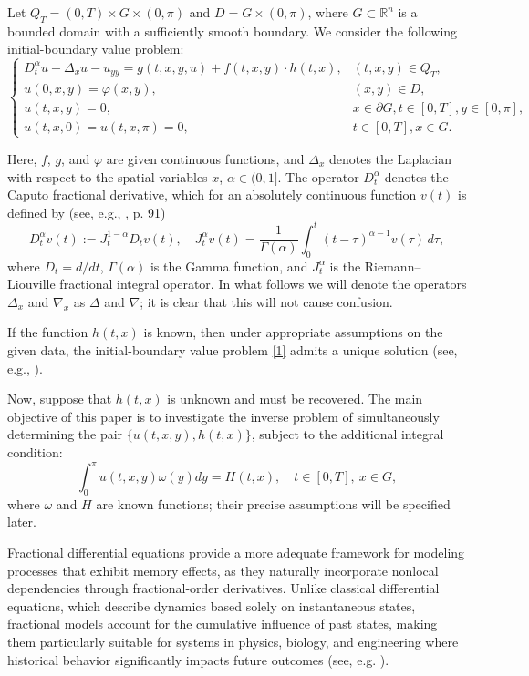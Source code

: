 \documentclass[12pt]{amsart}
\theoremstyle{definition}
\numberwithin{equation}{section}
\begin{document}
Let $Q_T = (0, T) \times G \times (0, \pi)$ and $D = G \times (0, \pi)$, where $G \subset \mathbb{R}^n$ is a bounded domain with a sufficiently smooth boundary. We consider the following initial-boundary value problem:
\begin{equation} \label{1}
\begin{cases}
D_t^{\alpha} u - \Delta_x u - u_{yy} = g(t, x, y, u) + f(t, x, y) \cdot h(t, x), & (t, x, y) \in Q_T, \\
u(0, x, y) = \varphi(x, y), & (x, y) \in D, \\
u(t, x, y) = 0, & x \in \partial G, t \in [0, T], y \in [0, \pi], \\
u(t, x, 0) = u(t, x, \pi) = 0, & t \in [0, T], x \in G.
\end{cases}
\end{equation}

Here, $f$, $g$, and $\varphi$ are given continuous functions, and $\Delta_x$ denotes the Laplacian with respect to the spatial variables $x$, $\alpha \in (0, 1]$. The operator $D_t^\alpha$ denotes the Caputo fractional derivative, which for an absolutely continuous function $v(t)$ is defined by (see, e.g., \cite{Kil}, p. 91)
$$
D_t^\alpha v(t) := J_t^{1 - \alpha} D_t v(t), \quad J_t^\alpha v(t) = \frac{1}{\Gamma(\alpha)} \int_0^t (t - \tau)^{\alpha - 1} v(\tau)\, d\tau,
$$
where $D_t = d/dt$, $\Gamma(\alpha)$ is the Gamma function, and $J_t^\alpha$ is the Riemann–Liouville fractional integral operator. In what follows we will denote the operators $\Delta_x$ and $\nabla_x$ as $\Delta$ and $\nabla$; it is clear that this will not cause confusion.

If the function $h(t, x)$ is known, then under appropriate assumptions on the given data, the initial-boundary value problem \eqref{1} admits a unique solution (see, e.g., \cite{Gal}).

Now, suppose that $h(t, x)$ is unknown and must be recovered. The main objective of this paper is to investigate the inverse problem of simultaneously determining the pair $\{ u(t, x, y), h(t, x) \}$, subject to the additional integral condition:
\begin{equation} \label{overdetermination}
\int_0^\pi u(t, x, y) \omega(y) dy = H(t, x), \quad t \in [0, T],\ x \in G,
\end{equation}
where $\omega$ and $H$ are known functions; their precise assumptions will be specified later.


Fractional differential equations provide a more adequate framework for modeling processes that exhibit memory effects, as they naturally incorporate nonlocal dependencies through fractional-order derivatives. Unlike classical differential equations, which describe dynamics based solely on instantaneous states, fractional models account for the cumulative influence of past states, making them particularly suitable for systems in physics, biology, and engineering where historical behavior significantly impacts future outcomes (see, e.g. \cite{Machado}). 
\end{document}
